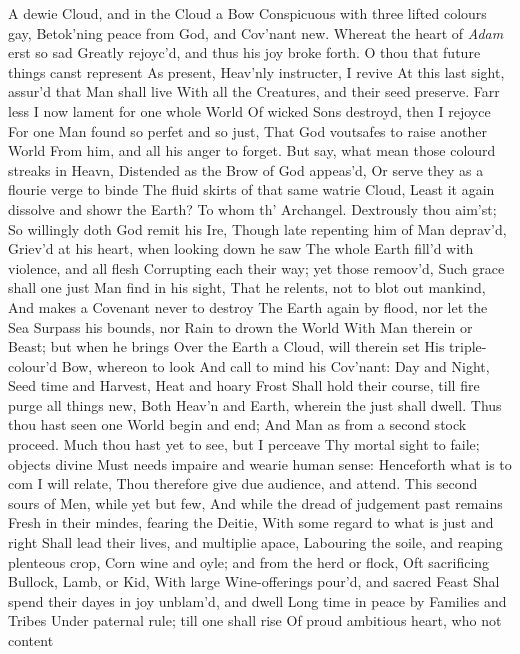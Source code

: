 \documentclass[11pt]{book}
\newcounter {last}
\begin{document}
A dewie Cloud, and in the Cloud a Bow 
Conspicuous with three lifted colours gay, 
Betok'ning peace from God, and Cov'nant new. 
Whereat the heart of \textit{Adam} erst so sad 
Greatly rejoyc'd, and thus his joy broke forth. 
\quad O thou that future things canst represent 
As present, Heav'nly instructer, I revive 
At this last sight, assur'd that Man shall live 
With all the Creatures, and their seed preserve. 
Farr less I now lament for one whole World 
Of wicked Sons destroyd, then I rejoyce 
For one Man found so perfet and so just, 
That God voutsafes to raise another World 
From him, and all his anger to forget. 
But say, what mean those colourd streaks in Heavn, 
Distended as the Brow of God appeas'd, 
Or serve they as a flourie verge to binde 
The fluid skirts of that same watrie Cloud, 
Least it again dissolve and showr the Earth? 
\quad To whom th' Archangel.  Dextrously thou aim'st; 
So willingly doth God remit his Ire, 
Though late repenting him of Man deprav'd, 
Griev'd at his heart, when looking down he saw 
The whole Earth fill'd with violence, and all flesh 
Corrupting each their way; yet those remoov'd, 
Such grace shall one just Man find in his sight, 
That he relents, not to blot out mankind, 
And makes a Covenant never to destroy 
The Earth again by flood, nor let the Sea 
Surpass his bounds, nor Rain to drown the World 
With Man therein or Beast; but when he brings 
Over the Earth a Cloud, will therein set 
His triple-colour'd Bow, whereon to look 
And call to mind his Cov'nant: Day and Night, 
Seed time and Harvest, Heat and hoary Frost 
Shall hold their course, till fire purge all things new, 
Both Heav'n and Earth, wherein the just shall dwell. 
Thus thou hast seen one World begin and end; 
And Man as from a second stock proceed. 
Much thou hast yet to see, but I perceave 
Thy mortal sight to faile; objects divine 
Must needs impaire and wearie human sense: 
Henceforth what is to com I will relate, 
Thou therefore give due audience, and attend. 
This second sours of Men, while yet but few, 
And while the dread of judgement past remains 
Fresh in their mindes, fearing the Deitie, 
With some regard to what is just and right 
Shall lead their lives, and multiplie apace, 
Labouring the soile, and reaping plenteous crop, 
Corn wine and oyle; and from the herd or flock, 
Oft sacrificing Bullock, Lamb, or Kid, 
With large Wine-offerings pour'd, and sacred Feast 
Shal spend their dayes in joy unblam'd, and dwell 
Long time in peace by Families and Tribes 
Under paternal rule; till one shall rise 
Of proud ambitious heart, who not content 
\end{document}
